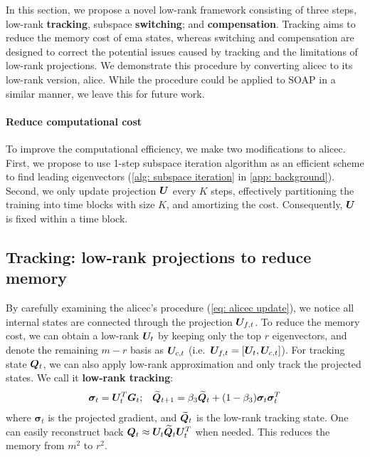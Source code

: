 \label{sec: memory efficient opt}

In this section, we propose a novel low-rank framework consisting of three steps, low-rank \textbf{tracking}, subspace \textbf{switching}; and \textbf{compensation}. Tracking aims to reduce the memory cost of \gls{ema} states, whereas switching and compensation are designed to correct the potential issues caused by tracking and the limitations of low-rank projections. We demonstrate this procedure by converting \gls{alicec} to its low-rank version, \gls{alice}. While the procedure could be applied to SOAP in a similar manner, we leave this for future work. 

\paragraph{Reduce computational cost}
To improve the computational efficiency, we make two modifications to \gls{alicec}. First, we propose to use 1-step subspace iteration algorithm as an efficient scheme to find leading eigenvectors (\cref{alg: subspace iteration} in \cref{app: background}). Second, we only update projection ${\bm{U}}$ every $K$ steps, effectively partitioning the training into time blocks with size $K$, and amortizing the cost. Consequently, ${\bm{U}}$ is fixed within a time block. 

\subsection{Tracking: low-rank projections to reduce memory}
By carefully examining the \gls{alicec}'s procedure (\cref{eq: alicec update}), we notice all internal states are connected through the projection ${\bm{U}}_{f,t}$. To reduce the memory cost, we can obtain a low-rank ${\bm{U}}_t$ by keeping only the top $r$ eigenvectors, and denote the remaining $m-r$ basis as ${\bm{U}}_{c,t}$ (i.e.~${\bm{U}}_{f,t}=[{\bm{U}}_t, {\bm{U}}_{c,t}]$). For tracking state ${\bm{Q}}_t$, we can also apply low-rank approximation and only track the projected states. We call it \textbf{low-rank tracking}:
\begin{align}
    \bm{\sigma}_t = {\bm{U}}_t^T{\bm{G}}_t;\;\;\;\widetilde{{\bm{Q}}}_{t+1} = \beta_3\widetilde{{\bm{Q}}}_{t} + (1-\beta_3)\bm{\sigma}_{t}\bm{\sigma}_t^T
    \label{eq: tracking step}
\end{align}
where $\bm{\sigma}_t$ is the projected gradient, and $\widetilde{{\bm{Q}}}_t$ is the low-rank tracking state. One can easily reconstruct back ${\bm{Q}}_t \approx {\bm{U}}_t\widetilde{{\bm{Q}}}_t{\bm{U}}_t^T$ when needed. This reduces the memory from $m^2$ to $r^2$. 

